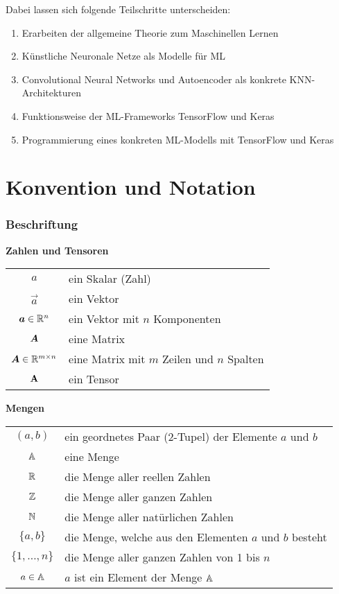 Dabei lassen sich folgende Teilschritte unterscheiden:
\begin{enumerate}
  \item{Erarbeiten der allgemeine Theorie zum Maschinellen Lernen}
  \item{Künstliche Neuronale Netze als Modelle für ML}
  \item{Convolutional Neural Networks und Autoencoder als konkrete KNN-Architekturen}
  \item{Funktionsweise der ML-Frameworks TensorFlow und Keras}
  \item{Programmierung eines konkreten ML-Modells mit TensorFlow und Keras}
\end{enumerate}



\chapter*{Konvention und Notation}

\subsection*{Beschriftung}

\begin{center}\textbf{Zahlen und Tensoren}\end{center}
\begin{tabular}{cl}
  $a$ & ein Skalar (Zahl) \\
  $\vec{a}$ & ein Vektor \\
  $\bm{a} \in \mathbb{R}^{n}$ & ein Vektor mit $n$ Komponenten \\
  $\bm{A}$ & eine Matrix \\
  $\bm{A} \in \mathbb{R}^{m \times n}$ & eine Matrix mit $m$ Zeilen und $n$ Spalten \\
  $\mathbf{A}$ & ein Tensor \\

\end{tabular}

\begin{center}\textbf{Mengen}\end{center}
\begin{tabular}{cl}
  $(a,b)$ & ein geordnetes Paar (2-Tupel) der Elemente $a$ und $b$ \\
  $\mathbb{A}$ & eine Menge \\
  $\mathbb{R}$ & die Menge aller reellen Zahlen \\
  $\mathbb{Z}$ & die Menge aller ganzen Zahlen \\
  $\mathbb{N}$ & die Menge aller natürlichen Zahlen \\
  $\{a,b\}$ & die Menge, welche aus den Elementen $a$ und $b$ besteht \\
  $\{1,\ldots,n\}$ & die Menge aller ganzen Zahlen von 1 bis $n$ \\
  $a \in \mathbb{A}$ & $a$ ist ein Element der Menge $\mathbb{A}$ \\

\end{tabular}

